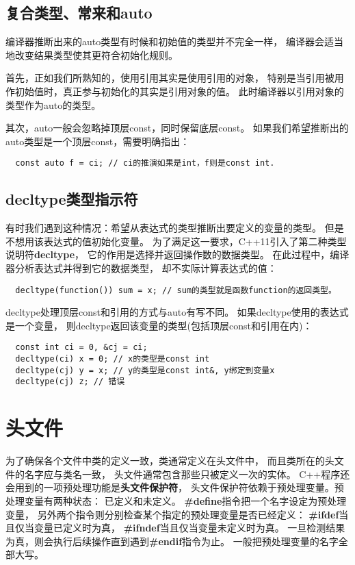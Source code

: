\subsection{复合类型、常来和auto}
编译器推断出来的auto类型有时候和初始值的类型并不完全一样，%
编译器会适当地改变结果类型使其更符合初始化规则。%
\par
首先，正如我们所熟知的，使用引用其实是使用引用的对象，%
特别是当引用被用作初始值时，真正参与初始化的其实是引用对象的值。%
此时编译器以引用对象的类型作为auto的类型。
\par
其次，auto一般会忽略掉顶层const，同时保留底层const。%
如果我们希望推断出的auto类型是一个顶层const，需要明确指出：
\begin{lstlisting}
  const auto f = ci; // ci的推演如果是int，f则是const int.
\end{lstlisting}
\subsection{decltype类型指示符}
有时我们遇到这种情况：希望从表达式的类型推断出要定义的变量的类型。%
但是不想用该表达式的值初始化变量。%
为了满足这一要求，C++11引入了第二种类型说明符{\bfseries{decltype}}，%
它的作用是选择并返回操作数的数据类型。%
在此过程中，编译器分析表达式并得到它的数据类型，%
却不实际计算表达式的值：
\begin{lstlisting}
  decltype(function()) sum = x; // sum的类型就是函数function的返回类型。
\end{lstlisting}
\par
decltype处理顶层const和引用的方式与auto有写不同。%
如果decltype使用的表达式是一个变量，%
则decltype返回该变量的类型(包括顶层const和引用在内)：
\begin{lstlisting}
  const int ci = 0, &cj = ci;
  decltype(ci) x = 0; // x的类型是const int
  decltype(cj) y = x; // y的类型是const int&, y绑定到变量x
  decltype(cj) z; // 错误
\end{lstlisting}

\section{头文件}
为了确保各个文件中类的定义一致，类通常定义在头文件中，%
而且类所在的头文件的名字应与类名一致，%
头文件通常包含那些只被定义一次的实体。%
C++程序还会用到的一项预处理功能是{\bfseries{头文件保护符}}，%
头文件保护符依赖于预处理变量。预处理变量有两种状态：%
已定义和未定义。%
{\bfseries{\#define}}指令把一个名字设定为预处理变量，%
另外两个指令则分别检查某个指定的预处理变量是否已经定义：%
{\bfseries{\#ifdef}}当且仅当变量已定义时为真，%
{\bfseries{\#ifndef}}当且仅当变量未定义时为真。%
一旦检测结果为真，则会执行后续操作直到遇到{\bfseries{\#endif}}指令为止。%
一般把预处理变量的名字全部大写。

